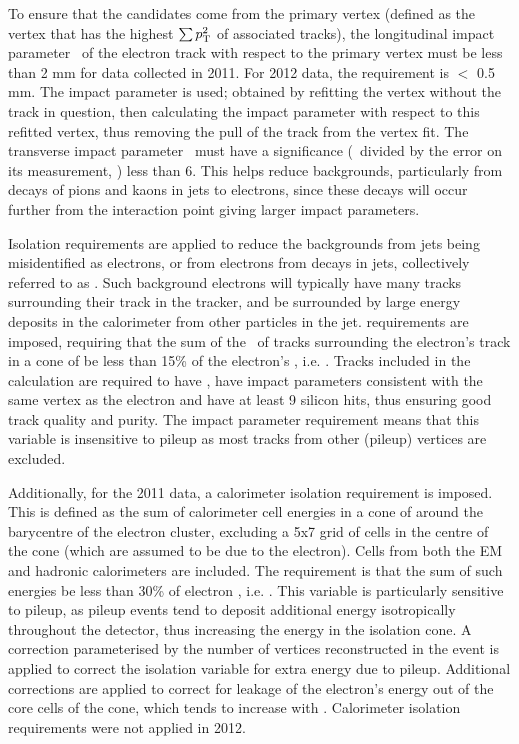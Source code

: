 To ensure that the candidates come from the primary vertex (defined as the
vertex that has the highest $\sum{\ensuremath{p_{\mathrm{T}}}^2}$ of associated tracks), the
longitudinal impact parameter \zzero\ of the electron track with respect to the
primary vertex must be less than 2 mm for data collected in 2011. For 2012 data,
the requirement is \zzerosintheta $<$ 0.5 mm. The  impact
parameter is used; obtained by refitting the vertex without the track in
question, then calculating the impact parameter with respect to this refitted
vertex, thus removing the pull of the track from the vertex fit.  The transverse
impact parameter \dzero\ must have a significance (\dzero\ divided by the error
on its measurement, \dzerosig) less than 6. This helps reduce backgrounds,
particularly from decays of pions and kaons in jets to electrons, since these
decays will occur further from the interaction point giving larger impact
parameters.

Isolation requirements are applied to reduce the backgrounds from jets being
misidentified as electrons, or from electrons from decays in jets, collectively
referred to as . Such background electrons will
typically have many tracks surrounding their track in the tracker, and be
surrounded by large energy deposits in the calorimeter from other particles in
the jet.  requirements are imposed, requiring that the
sum of the \pt\ of tracks surrounding the electron's track in a cone of
 be less than 15\% of the electron's \pt, i.e.
. Tracks included in the calculation are required to have
, have impact parameters consistent with the same vertex as the
electron and have at least 9 silicon hits, thus ensuring good track quality and
purity. The impact parameter requirement means that this variable is insensitive
to pileup as most tracks from other (pileup) vertices are excluded.

Additionally, for the 2011 data, a calorimeter isolation requirement is imposed.
This is defined as the sum of calorimeter cell energies in a cone of
 around the barycentre of the electron cluster, excluding a 5x7
grid of cells in the centre of the cone (which are assumed to be due to the
electron). Cells from both the EM and hadronic calorimeters are included. The
requirement is that the sum of such energies be less than 30\% of electron \et,
i.e. .  This variable is particularly sensitive to pileup,
as pileup events tend to deposit additional energy isotropically throughout the
detector, thus increasing the energy in the isolation cone. A correction
parameterised by the number of vertices reconstructed in the event is applied to
correct the isolation variable for extra energy due to pileup.  Additional
corrections are applied to correct for leakage of the electron's energy out of
the core cells of the cone, which tends to increase with \pt. Calorimeter
isolation requirements were not applied in 2012.

